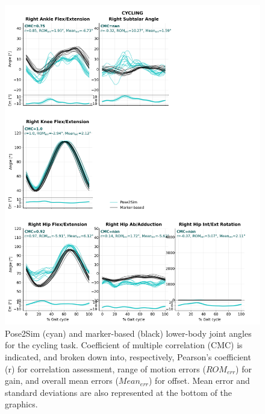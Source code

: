\begin{figure}[!ht]
	\centering
	\def\svgwidth{1\columnwidth}
	\fontsize{10pt}{10pt}\selectfont
	\includegraphics[height=\dimexpr\textheight-119pt]{"../Annexes/Figures/Fig_QTMBike.png"}
	\caption{Pose2Sim (cyan) and marker-based (black) lower-body joint angles for the cycling task. Coefficient of multiple correlation (CMC) is indicated, and broken down into, respectively, Pearson’s coefficient (r) for correlation assessment, range of motion errors (\(ROM_{err}\)) for gain, and overall mean errors (\(Mean_{err}\)) for offset. Mean error and standard deviations are also represented at the bottom of the graphics.}
	\label{fig_qtmbike}
\end{figure}

